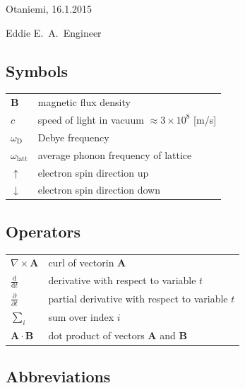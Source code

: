 \documentclass[english,12pt,a4paper,pdftex,elec,utf8]{aaltothesis}
\begin{document}
\vspace{5cm}
Otaniemi, 16.1.2015

\vspace{5mm}
{\hfill Eddie E.\ A.\ Engineer \hspace{1cm}}

\newpage


\thesistableofcontents



\subsection*{Symbols}

\begin{tabular}{ll}
$\mathbf{B}$  & magnetic flux density  \\
$c$              & speed of light in vacuum $\approx 3\times10^8$ [m/s]\\
$\omega_{\mathrm{D}}$    & Debye frequency \\
$\omega_{\mathrm{latt}}$ & average phonon frequency of lattice \\
$\uparrow$       & electron spin direction up\\
$\downarrow$     & electron spin direction down
\end{tabular}

\subsection*{Operators}

\begin{tabular}{ll}
$\nabla \times \mathbf{A}$              & curl of vectorin $\mathbf{A}$\\
$\displaystyle\frac{\mbox{d}}{\mbox{d} t}$ & derivative with respect to 
variable $t$\\[3mm]
$\displaystyle\frac{\partial}{\partial t}$  & partial derivative with respect 
to variable $t$ \\[3mm]
$\sum_i $                       & sum over index $i$\\
$\mathbf{A} \cdot \mathbf{B}$    & dot product of vectors $\mathbf{A}$ and 
$\mathbf{B}$
\end{tabular}

\subsection*{Abbreviations}
\end{document}
